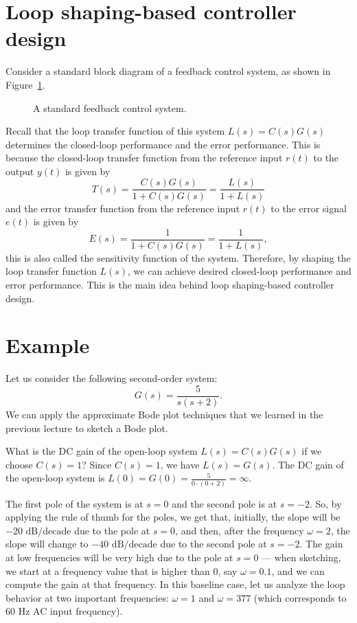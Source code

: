 \documentclass{ee122_notes}
\begin{document}
\section{Loop shaping-based controller design}
Consider a standard block diagram of a feedback control system, as shown in Figure~\ref{fig:block-diagram}.
\begin{figure}[h]
  \centering
  \begin{blockdiagram}
  \end{blockdiagram}
  \caption{A standard feedback control system.}
  \label{fig:block-diagram}
  \end{figure}
  Recall that the loop transfer function of this system $L(s) = C(s)G(s)$ determines the closed-loop performance and the error performance. This is because the closed-loop transfer function from the reference input $r(t)$ to the output $y(t)$ is given by
\[
T(s) = \frac{C(s)G(s)}{1 + C(s)G(s)} = \frac{L(s)}{1 + L(s)}
\]
and the error transfer function from the reference input $r(t)$ to the error signal $e(t)$ is given by
\[  
E(s) = \frac{1}{1 + C(s)G(s)} = \frac{1}{1 + L(s)},
\]
this is also called the sensitivity function of the system. Therefore, by shaping the loop transfer function $L(s)$, we can achieve desired closed-loop performance and error performance. This is the main idea behind loop shaping-based controller design.

\section{Example}
Let us consider the following second-order system:
\[
G(s) = \frac{5}{s(s + 2)}.
\]
We can apply the approximate Bode plot techniques that we learned in the previous lecture to sketch a Bode plot.

\begin{popquiz}
What is the DC gain of the open-loop system $L(s) = C(s)G(s)$ if we choose $C(s) = 1$?
\popqsplit 
Since $C(s) = 1$, we have $L(s) = G(s)$. The DC gain of the open-loop system is $L(0) = G(0) = \frac{5}{0 \cdot (0 + 2)} = \infty$.
\end{popquiz}

The first pole of the system is at $s = 0$ and the second pole is at $s = -2$. So, by applying the rule of thumb for the poles, we get that, initially, the slope will be $-20 \text{ dB/decade}$ due to the pole at $s = 0$, and then, after the frequency $\omega = 2$, the slope will change to $-40 \text{ dB/decade}$ due to the second pole at $s = -2$. The gain at low frequencies will be very high due to the pole at $s = 0$ --- when sketching, we start at a frequency value that is higher than 0, say $\omega = 0.1$, and we can compute the gain at that frequency. In this baseline case, let us analyze the loop behavior at two important frequencies: $\omega = 1$ and $\omega = 377$ (which corresponds to 60 Hz AC input frequency). 
\end{document}
